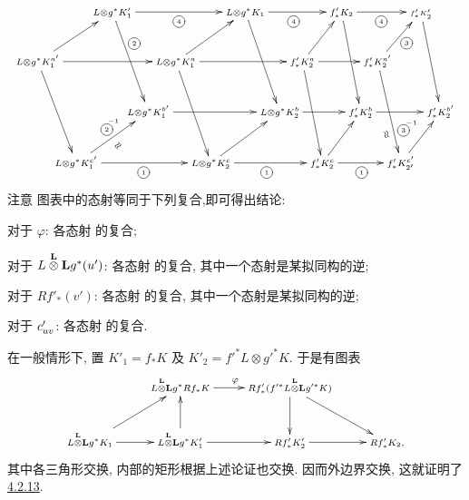 \[
\def\objectstyle{\scriptstyle}
\xymatrix@C=-.34cm{
        &         & \scriptstyle{L\otimes g^{\ast}K'_1}\ar[rrrrrr]_*+[o][F-]{\scriptscriptstyle{4}} \ar[rdd]^(.35)*+[o][F-]{\scriptscriptstyle{2}}&        && &         &
          & \scriptstyle{L\otimes g^{\ast}K_1} \ar[rdd] \ar[rrrrr]_*+[o][F-]{\scriptscriptstyle{4}}& & & & & \scriptstyle{f'_{\ast}K_2} \ar[rrrrr]_*+[o][F-]{\scriptscriptstyle{4}}\ar[rdd] & & & && \scriptscriptstyle{f'_{\ast}K'_2} \ar[rdd]\\
\scriptstyle{L\otimes g^{\ast}K_1^{a'}} \ar[rru]\ar[rdd]\ar[rrrrrr] &         &
        &        && & \scriptstyle{L\otimes g^{\ast}K_1\sisi{}{^a}} \ar[rru] \ar[rdd]\ar[rrrrr]&       &
        &&& \scriptstyle{f'_{\ast}K^{a}_2}\ar[rdd]\ar[rru] \ar[rrrrr]&
        & & & &
        \scriptstyle{f'_{\ast}K^{a'}_2}\ar[rru]_*+[o][F-]{\scriptscriptstyle{3}}\ar[rdd]^(.7)*+[o][F-]{\scriptscriptstyle{3}}^{\quad \raisebox{1cm}{}{\scriptscriptstyle{-1}}}_(.7){\text{\rotatebox{110}{$\approx$}}}\\
  &         &      & \scriptstyle{L\otimes g^{\ast}K^{\sisi{c}{b}'}_1}  \ar[rrrrrr]
        && &         &         &   & \scriptstyle{L\otimes g^{\ast}K^{b}_2}
        \ar[rrrrr]& & & & & \scriptstyle{f'_{\ast}K^{b}_2} \ar[rrrrr]& & & & & \scriptstyle{f'_{\ast}K^{b'}_2}\\
          &\scriptstyle{L\otimes g^{\ast}K^{c'}_1}
 \ar[rrrrrr]_*+[o][F-]{\scriptscriptstyle{1}}\ar[rru]_{\text{\rotatebox{50}{$\approx$}}}^*+[o][F-]{\scriptscriptstyle{2}}^{\qquad\qquad \raisebox{-.3cm}{}{\scriptscriptstyle{-1}}}
&      &        && &         &\scriptstyle{L\otimes g^{\ast}K^{c}_2} \ar[rru] \ar[rrrrr]_*+[o][F-]{\scriptscriptstyle{1}}& & & & &\scriptstyle{f'_{\ast}K^{c}_2}\ar[rru]\ar[rrrrr]_*+[o][F-]{\scriptscriptstyle{1}}&
        & & & & \scriptstyle{f'_{\ast}K^{c'}_{2'}}\ar[rru]\\
}
\]
注意  图表中的态射等同于下列复合,\pageoriginale 即可得出结论:

对于 $\varphi$: 各态射  的复合;

对于 $L\overset{\LL}{\otimes}\sisi{L}{\LL}g^{\ast}(u')$: 各态射  的复合, 其中一个态射是某拟同构的逆;

对于 $Rf'_{\ast}(v')$: 各态射  的复合, 其中一个态射是某拟同构的逆;

对于 $\sisi{C}{c}'_{uv}$: 各态射  的复合.

在一般情形下, 置 $K'_{1}=f_{\ast}K$ 及 $K'_{2}={f'}^{\ast}L\otimes {g'}^{\ast}K$. 于是有图表
\[
\xymatrix{
&L \overset{\LL}{\otimes} \sisi{L}{\LL}g^{\ast}Rf_{\ast}K
\ar[r]^\varphi&
Rf'_{\ast}(f'^{\ast}L \overset{\LL}{\otimes}\sisi{L}{\LL}
g'^{\ast}K) \ar[d] \ar[rd]& \\
L \overset{\LL}{\otimes} \sisi{L}{\LL}g^{\ast}K_1 \ar[r]\ar[ru]& L
\overset{\LL}{\otimes} \sisi{L}{\LL}g^{\ast}K'_1 \ar[r] \ar[u]&
Rf'_{\ast}K'_2 \ar[r]&  Rf'_{\ast}K_2,
}
\]
其中各三角形交换, 内部的矩形根据上述论证也交换. 因而外边界交换, 这就证明了 \hyperref[XVII.prop4.2.13]{4.2.13}.

